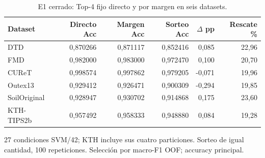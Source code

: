 \begin{table}[!htbp]\centering
\fontsize{8}{10}\selectfont\setlength{\tabcolsep}{4pt}
\caption{E1 cerrado: Top-4 fijo directo y por margen en seis datasets.}\label{tab:e1-fixed4-accuracy}
\begin{tabular}{@{}lrrrrr@{}}\toprule
Dataset & Directo Acc & Margen Acc & Sorteo Acc & $\Delta$ pp & Rescate \%\\\midrule
DTD & 0,870266 & 0,871117 & 0,852416 & 0,085 & 22,96\\
FMD & 0,982000 & 0,983000 & 0,972470 & 0,100 & 20,70\\
CUReT & 0,998574 & 0,997862 & 0,979205 & -0,071 & 19,96\\
Outex13 & 0,929412 & 0,926471 & 0,900309 & -0,294 & 19,85\\
SoilOriginal & 0,928947 & 0,930702 & 0,914868 & 0,175 & 23,60\\
KTH-TIPS2b & 0,957492 & 0,958333 & 0,948880 & 0,084 & 19,28\\
\bottomrule\end{tabular}
\par\smallskip\begin{minipage}{0.98\textwidth}\footnotesize 27 condiciones SVM/42; KTH incluye sus cuatro particiones. Sorteo de igual cantidad, 100 repeticiones. Selección por macro-F1 OOF; accuracy principal.\end{minipage}
\end{table}
